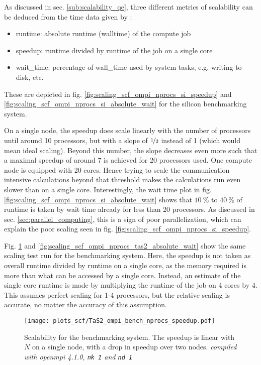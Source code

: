 \documentclass[main.tex]{subfiles}
\begin{document}
As discussed in sec. \ref{sub:scalability_qe}, three different metrics of scalability can be deduced from the time data given by \QE:
\begin{itemize}
    \item runtime: absolute runtime (walltime) of the compute job
    \item speedup: runtime divided by runtime of the job on a single core
    \item \gls{wait_time}: percentage of \gls{wall_time} used by system tasks, e.g. writing to disk, etc.
\end{itemize}
These are depicted in fig. \ref{fig:scaling_scf_ompi_nprocs_si_speedup} and \ref{fig:scaling_scf_ompi_nprocs_si_absolute_wait} for the silicon benchmarking system.

On a single node, the speedup does scale linearly with the number of processors until around 10 processors, but with a slope of \(\nicefrac{1}{2}\) instead of 1 (which would mean ideal scaling).
Beyond this number, the slope decreases even more such that a maximal speedup of around 7 is achieved for 20 processors used.
One compute node is equipped with 20 cores. Hence trying to scale the communication intensive calculations beyond that threshold makes the calculations run even slower than on a single core.
Interestingly, the wait time plot in fig. \ref{fig:scaling_scf_ompi_nprocs_si_absolute_wait} shows that \(\SI{10}{\percent}\) to \(\SI{40}{\percent}\) of runtime is taken by wait time already for less than 20 processors.
As discussed in sec. \ref{sec:parallel_computing}, this is a sign of poor parallelization, which can explain the poor scaling seen in fig. \ref{fig:scaling_scf_ompi_nprocs_si_speedup}.

Fig. \ref{fig:scaling_scf_ompi_nprocs_tas2_speedup} and \ref{fig:scaling_scf_ompi_nprocs_tas2_absolute_wait} show the same scaling test run for the \TaS benchmarking system.
Here, the speedup is not taken as overall runtime divided by runtime on a single core, as the memory required is more than what can be accessed by a single core.
Instead, an estimate of the single core runtime is made by multiplying the runtime of the job on 4 cores by 4. 
This assumes perfect scaling for 1-4 processors, but the relative scaling is accurate, no matter the accuracy of this assumption.

\begin{figure}
\centering
\texttt{[image: plots\_scf/TaS2\_ompi\_bench\_nprocs\_speedup.pdf]}
\caption{Scalability for the \TaS benchmarking system. The speedup is linear with \(N\) on a single node, with a drop in speedup over two nodes. \emph{ compiled with \gls{openmpi} 4.1.0, \texttt{nk 1} and \texttt{nd 1}}}
\label{fig:scaling_scf_ompi_nprocs_tas2_speedup}
\end{figure}
\end{document}
